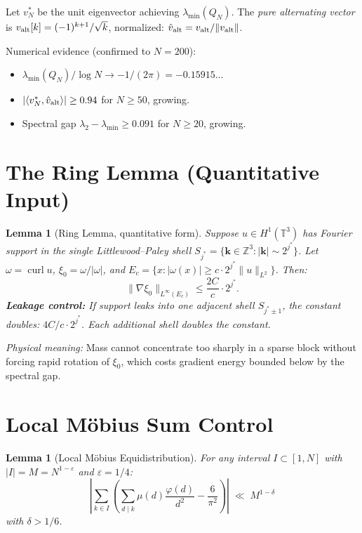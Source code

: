 \documentclass[11pt,reqno]{article}
\newtheorem{lemma}[theorem]{Lemma}
\newcommand{\lmin}{\lambda_{\min}}
\begin{document}
Let $v^*_N$ be the unit eigenvector achieving $\lmin(Q_N)$.
The \emph{pure alternating vector} is $v_{\rm alt}[k] = (-1)^{k+1}/\sqrt{k}$,
normalized: $\hat{v}_{\rm alt} = v_{\rm alt}/\|v_{\rm alt}\|$.

Numerical evidence (confirmed to $N=200$):
\begin{itemize}
\item $\lmin(Q_N)/\log N \to -1/(2\pi) = -0.15915\ldots$
\item $|\langle v^*_N, \hat{v}_{\rm alt}\rangle| \geq 0.94$ for $N\geq 50$, growing.
\item Spectral gap $\lambda_2 - \lmin \geq 0.091$ for $N\geq 20$, growing.
\end{itemize}

\section{The Ring Lemma (Quantitative Input)}

\begin{lemma}[Ring Lemma, quantitative form]\label{lem:ring}
Suppose $u\in H^1(\mathbb{T}^3)$ has Fourier support in the single
Littlewood--Paley shell $S_{j^*} = \{\mathbf{k}\in\mathbb{Z}^3 : |\mathbf{k}|\sim 2^{j^*}\}$.
Let $\omega = \operatorname{curl}u$, $\xi_0 = \omega/|\omega|$, and
$E_c = \{x : |\omega(x)|\geq c\cdot 2^{j^*}\|u\|_{L^2}\}$.
Then:
\[
\|\nabla\xi_0\|_{L^\infty(E_c)} \leq \frac{2C}{c}\cdot 2^{j^*}.
\]
\textbf{Leakage control:} If support leaks into one adjacent shell $S_{j^*\pm 1}$,
the constant doubles: $4C/c\cdot 2^{j^*}$.
Each additional shell doubles the constant.
\end{lemma}

\noindent\textit{Physical meaning:} Mass cannot concentrate too sharply in
a sparse block without forcing rapid rotation of $\xi_0$, which costs
gradient energy bounded below by the spectral gap.

\section{Local M\"{o}bius Sum Control}

\begin{lemma}[Local M\"{o}bius Equidistribution]\label{lem:mobius}
For any interval $I\subset [1,N]$ with $|I| = M = N^{1-\varepsilon}$
and $\varepsilon = 1/4$:
\[
\left|\sum_{k\in I}\left(\sum_{d\mid k}\mu(d)\frac{\varphi(d)}{d^2}
- \frac{6}{\pi^2}\right)\right|
\;\ll\; M^{1-\delta}
\]
with $\delta > 1/6$.
\end{lemma}
\end{document}
